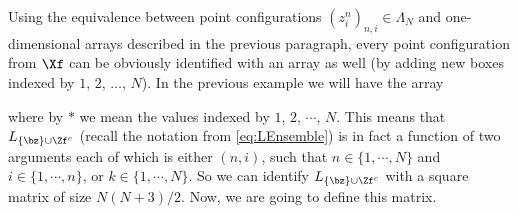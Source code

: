 \documentclass[]{pcmi}
\theoremstyle{plain}
\theoremstyle{definition}
\begin{document}
Using the equivalence between point configurations $(z^n_i)_{n, i} \in \Lambda_N$ and one-dimensional arrays described in the previous paragraph, every point configuration from $\Xf$ can be obviously identified with an array as well (by adding new boxes indexed by $1$, $2$, $\ldots$, $N$). In the previous example we will have the array
\begin{center}
\end{center}
where by $*$ we mean the values indexed by $1$, $2$, $\cdots$, $N$. This means that $L_{\{\bz\}\cup\Zf^c}$ (recall the notation from \eqref{eq:LEnsemble}) is in fact a function of two arguments each of which is either  $(n, i)$, such that $n \in \{1, \cdots, N\}$ and $i \in \{1, \cdots, n\}$, or $k \in \{1, \cdots, N\}$. So we can identify $L_{\{\bz\}\cup\Zf^c}$ with a square matrix of size $N(N+3) / 2$. Now, we are going to define this matrix. 
\end{document}
